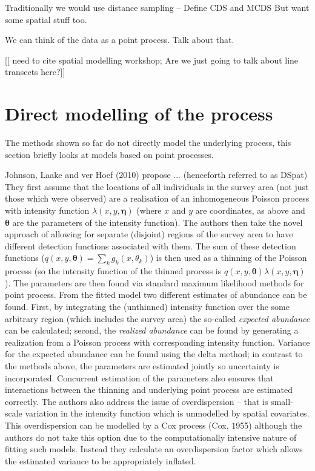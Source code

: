 \documentclass[useAMS,referee]{biom}
\begin{document}
Traditionally we would use distance sampling -- Define CDS and MCDS
But want some spatial stuff too.

We can think of the data as a point process.
Talk about that.

[[ need to cite spatial modelling workshop; Are we just going to talk about line transects here?]]



\section{Direct modelling of the process}

The methods shown so far do not directly model the underlying process, this section briefly looks at models based on point processes.

Johnson, Laake and ver Hoef (2010) propose ... (henceforth referred to as DSpat) They first assume that the locations of all individuals in the survey area (not just those which were observed) are a realisation of an inhomogeneous Poisson process with intensity function $\lambda(x,y,\bm{\eta})$ (where $x$ and $y$ are coordinates, as above and $\bm{\theta}$ are the parameters of the intensity function). The authors then take the novel approach of allowing for separate (disjoint) regions of the survey area to have different detection functions associated with them. The sum of these detection functions ($q(x,y,\bm{\theta}) = \sum_k g_k(x,\theta_k)$) is then used as a thinning of the Poisson process (so the intensity function of the thinned process is $q(x,y,\bm{\theta})\lambda(x,y,\bm{\eta})$). The parameters are then found via standard maximum likelihood methods for point process. From the fitted model two different estimates of abundance can be found. First, by integrating the (unthinned) intensity function over the some arbitrary region (which includes the survey area) the so-called \textit{expected abundance} can be calculated; second, the \textit{realized abundance} can be found by generating a realization from a Poisson process with corresponding intensity function. Variance for the expected abundance can be found using the delta method; in contrast to the methods above, the parameters are estimated jointly so uncertainty is incorporated. Concurrent estimation of the parameters also ensures that interactions between the thinning and underlying point process are estimated correctly. The authors also address the issue of overdispersion -- that is small-scale variation in the intensity function which is unmodelled by spatial covariates. This overdispersion can be modelled by a Cox process (Cox, 1955) although the authors do not take this option due to the computationally intensive nature of fitting such models. Instead they calculate an overdispersion factor which allows the estimated variance to be appropriately inflated.
\end{document}
